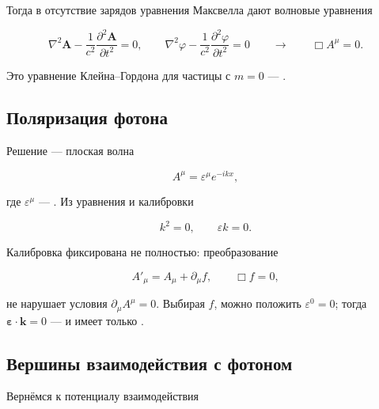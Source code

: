 \documentclass[../final.tex]{subfiles}
\begin{document}
Тогда в отсутствие зарядов уравнения Максвелла дают волновые
уравнения

\begin{equation*}
    \nabla^2\mathbf A
    -
    \frac{1}{c^2}\frac{\partial^2\mathbf A}{\partial t^2}
    =
    0,
    \qquad
    \nabla^2\varphi
    -
    \frac{1}{c^2}\frac{\partial^2\varphi}{\partial t^2}
    =
    0
    \qquad\longrightarrow\qquad
    \Box A^\mu=0.
\end{equation*}

Это уравнение Клейна--Гордона для частицы с $m=0$ ---
.


\subsection{Поляризация фотона}

Решение --- плоская волна

\begin{equation*}
    A^\mu=\varepsilon^\mu e^{-ikx},
\end{equation*}

где $\varepsilon^\mu$ --- .
Из уравнения и калибровки

\begin{equation*}
    k^2=0,
    \qquad
    \varepsilon k=0.
\end{equation*}

Калибровка фиксирована не полностью: преобразование

\begin{equation*}
    A'_\mu=A_\mu+\partial_\mu f,
    \qquad
    \Box f=0,
\end{equation*}

не нарушает условия $\partial_\mu A^\mu=0$. Выбирая $f$, можно
положить $\varepsilon^0=0$; тогда
$\boldsymbol\varepsilon\cdot\mathbf k=0$ ---
 и имеет только
.


\subsection{Вершины взаимодействия с фотоном}

Вернёмся к потенциалу взаимодействия
\end{document}
